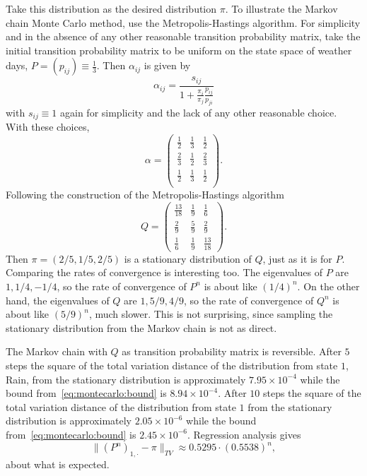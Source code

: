 \documentclass[12pt]{article}
\begin{document}
Take this distribution as the desired distribution \( \pi \).  To
illustrate the Markov chain Monte Carlo method, use the
Metropolis-Hastings algorithm.  For simplicity and in the absence of any
other reasonable transition probability matrix, take the initial
transition probability matrix to be uniform on the state space of
weather days, \( P = (p_{ij}) \equiv \frac{1}{3} \).  Then \( \alpha_{ij}
\) is given by
\[
    \alpha_{ij} = \frac{s_{ij}}{1 + \frac{\pi_i}{\pi_j} \frac{p_{ij}}{p_
    {ji}}}
\] with \( s_{ij} \equiv 1 \) again for simplicity and the lack of any
other reasonable choice.  With these choices,
\[
    \alpha =
    \begin{pmatrix}
        \frac{1}{2} & \frac{1}{3} & \frac{1}{2} \\
        \frac{2}{3} & \frac{1}{2} & \frac{2}{3} \\
        \frac{1}{2} & \frac{1}{3} & \frac{1}{2} \\
    \end{pmatrix}
    .
\] Following the construction of the Metropolis-Hastings algorithm
\[
    Q =
    \begin{pmatrix}
        \frac{13}{18} & \frac{1}{9} & \frac{1}{6} \\
        \frac{2}{9} & \frac{5}{9} & \frac{2}{9} \\
        \frac{1}{6} & \frac{1}{9} & \frac{13}{18}
    \end{pmatrix}
    .
\] Then \( \pi = (2/5, 1/5, 2/5) \) is a stationary distribution of \( Q
\), just as it is for \( P \).  Comparing the rates of convergence is
interesting too.  The eigenvalues of \( P \) are \( 1, 1/4, -1/4 \), so
the rate of convergence of \( P^n \) is about like \( (1/4)^n \).  On
the other hand, the eigenvalues of \( Q \) are \( 1, 5/9, 4/9 \), so the
rate of convergence of \( Q^{n} \) is about like \( (5/9)^n \), much
slower.  This is not surprising, since sampling the stationary
distribution from the Markov chain is not as direct.

The Markov chain with \( Q \) as transition probability matrix is
reversible.  After \( 5 \) steps the square of the total variation
distance of the distribution from state \( 1 \), Rain, from the
stationary distribution is approximately \( 7.95 \times 10^{-4} \) while
the bound from~\eqref{eq:montecarlo:bound} is \( 8.94 \times 10^ {-4} \).
After \( 10 \) steps the square of the total variation distance of the
distribution from state \( 1 \) from the stationary distribution is
approximately \( 2.05 \times 10^{-6} \) while the bound from~\eqref{eq:montecarlo:bound}
is \( 2.45 \times 10^{-6} \).  Regression analysis gives
\[
    \| (P^n)_{1, \cdot} - \pi \|_{TV} \approx 0.5295 \cdot (0.5538)^n,
\] about what is expected.
\end{document}
